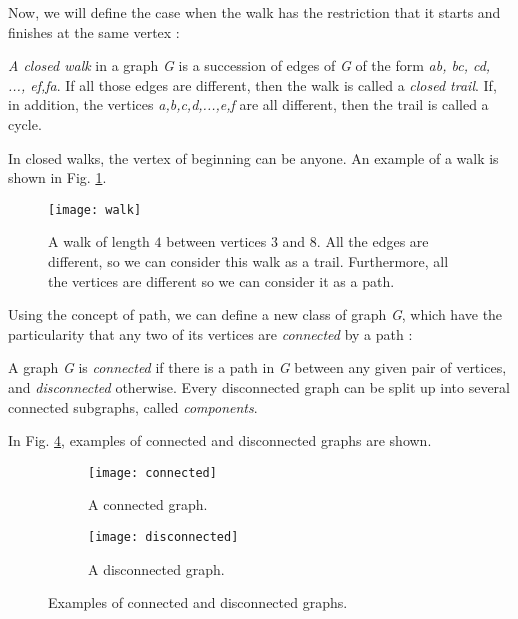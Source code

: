 Now, we will define the case when the walk has the restriction that it starts and finishes at the same vertex \cite{wilsonwatkins}:

\begin{defn}
\label{closed_walk}
        \textit{A closed walk} in a graph \textit{G} is a succession of edges of \textit{G} of the form \textit{ab, bc, cd, ..., ef,fa}. If all those edges are different, then the walk is called a \textit{closed trail}. If, in addition, the vertices \textit{a,b,c,d,...,e,f} are all different, then the trail is called a cycle. 
\end{defn}

In closed walks, the vertex of beginning can be anyone. An example of a walk is shown in Fig. \ref{fig:walk_path}.\\

\begin{figure}
	\centering
		\texttt{[image: walk]}
	\caption[Example of a walk.]{A walk of length $4$ between vertices $3$ and $8$. All the edges are different, so we can consider this walk as a trail. Furthermore, all the vertices are different so we can consider it as a path.}
	\label{fig:walk_path}
\end{figure}

Using the concept of path, we can define a new class of graph \textit{G}, which have the particularity that any two of its vertices are \textit{connected} by a path \cite{wilsonwatkins}:

\begin{defn}
\label{connected}
        A graph \textit{G} is \textit{connected} if there is a path in \textit{G} between any given pair of vertices, and \textit{disconnected} otherwise. Every disconnected graph can be split up into several connected subgraphs, called \textit{components}.
\end{defn}

In Fig. \ref{fig:connect}, examples of connected and disconnected graphs are shown.

\begin{figure}[h]
	\centering
	\begin{subfigure}[b]{0.4\textwidth}
		\centering
		\texttt{[image: connected]}
		\caption{A connected graph.}
		\label{fig:regular3}
	\end{subfigure}
	\hfill
	\begin{subfigure}[b]{0.4\textwidth}
		\centering
		\texttt{[image: disconnected]}
		\caption{A disconnected graph.}
		\label{fig:regular4}
	\end{subfigure}
	\caption{Examples of connected and disconnected graphs.}
	\label{fig:connect}
\end{figure}

